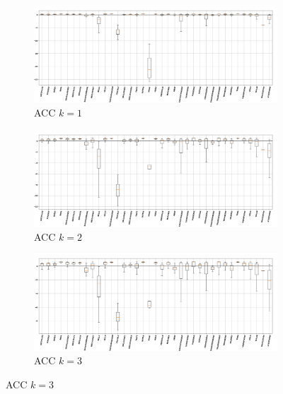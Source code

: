 \documentclass[12pt,letterpaper]{article}
\begin{document}
\begin{figure}[H]
\begin{center}


	\begin{subfigure}{1.0\textwidth}
	\centering
	\includegraphics[width=\textwidth , height=0.2\textheight]
		{../FiguresFeatures/ACC_1}
	\caption{ACC $k=1$}
	\end{subfigure}
	
	\begin{subfigure}{1.0\textwidth}
	\centering
	\includegraphics[width=\textwidth , height=0.2\textheight]
		{../FiguresFeatures/ACC_2}
	\caption{ACC $k=2$}
	\end{subfigure}
	
	\begin{subfigure}{1.0\textwidth}
	\centering
	\includegraphics[width=\textwidth , height=0.2\textheight]
		{../FiguresFeatures/ACC_3}
	\caption{ACC $k=3$}
	\end{subfigure}
	

\end{center}
\end{figure}
\end{document}
